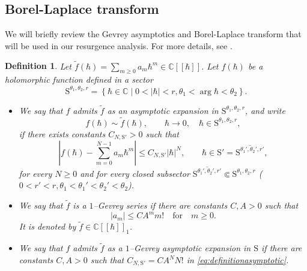 \documentclass[11pt]{amsart}
\theoremstyle{plain}
\newtheorem{defn}[thm]{Definition}
\theoremstyle{definition}
\newcommand{\C}{\mathbb{C}}
\begin{document}
\subsection{Borel-Laplace transform}\label{sec:Gevrey-Borel}
We will briefly review the Gevrey asymptotics and Borel-Laplace transform that will be used in our resurgence analysis. For more details, see \cite{Balser,Costin,Ecalle1981I,Ecalle1981II,Ecalle1985III,MitschiSauzin2016,SauzinSplitting}.
\begin{defn}\label{defn:series}
Let
$\widetilde f(\hbar)
=
\sum\limits_{m\ge0}a_m\hbar^m
\in \C[[\hbar]]$. Let $f(\hbar)$ be a holomorphic function defined in a sector
$$
\text{S}^{\theta_1,\theta_2,r}
=\left\{\hbar\in\C
\mid
0<|\hbar|<r,
\theta_1<\arg\hbar<\theta_2
\right\}. 
$$
\begin{itemize}
\item We say that $f$ admits $\widetilde f$ as an asymptotic
expansion in $\text{S}^{\theta_1,\theta_2,r}$, and write
\begin{equation*}
f(\hbar)\sim \widetilde f(\hbar),
\qquad
\hbar\to0,\quad \hbar\in\text{S}^{\theta_1,\theta_2,r},
\end{equation*}
if there exists constants $C_{N,\text{S}'}>0$ such that
\begin{equation}\label{eq:definitionasymptotic}
\left|
f(\hbar)
-
\sum_{m=0}^{N-1}a_m\hbar^m
\right|
\le
C_{N,\text{S}'}|\hbar|^N,
\qquad
\hbar\in \text{S}' =\overline{\text{S}^{\theta_1',\theta_2',r'}},
\end{equation}  for every
$N\ge0$ and for every closed subsector $\overline{\text{S}^{\theta_1',\theta_2',r'}}\Subset\text{S}^{\theta_1,\theta_2,r}$ ($0<r'<r,
\theta_1<\theta_1'<\theta_2'<\theta_2$). 

\item We say that $\widetilde f$ is a $1$--Gevrey series if
there are constants $C,A>0$ such that 
$$
|a_m|\le C A^m m!\quad \text{for} \quad m\ge0. 
$$
It is denoted by $\widetilde f\in\C[[\hbar]]_1$.
\item We say that $f$ admits $\widetilde f$ as a $1$--Gevrey asymptotic
expansion in $\text{S}$ if there are constants $C,A>0$ such that
$C_{N,\text{S}'}= C A^N N!$ in \eqref{eq:definitionasymptotic}.
\end{itemize}
\end{defn}
\end{document}
